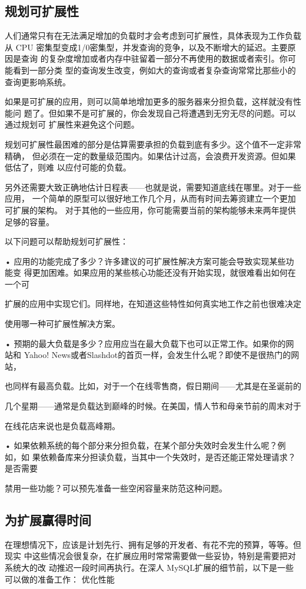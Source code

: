 \subsection{规划可扩展性}
人们通常只有在无法满足增加的负载时才会考虑到可扩展性，具体表现为工作负载从
CPU 密集型变成1/0密集型，并发查询的竞争，以及不断增大的延迟。主要原因是查询
的复杂度增加或者内存中驻留着一部分不再使用的数据或者索引。你可能看到一部分类
型的查询发生改变，例如大的查询或者复杂查询常常比那些小的查询更影响系统。

如果是可扩展的应用，则可以简单地增加更多的服务器来分担负载，这样就没有性能问
题了。但如果不是可扩展的，你会发现自己将遭遇到无穷无尽的问题。可以通过规划可
扩展性来避免这个问题。

规划可扩展性最困难的部分是估算需要承担的负载到底有多少。这个值不一定非常精确，
但必须在一定的数量级范围内。如果估计过高，会浪费开发资源。但如果低估了，则难
以应付可能的负载。

另外还需要大致正确地估计日程表——也就是说，需要知道底线在哪里。对于一些应用，
一个简单的原型可以很好地工作几个月，从而有时间去筹资建立一个更加可扩展的架构。
对于其他的一些应用，你可能需要当前的架构能够未来两年提供足够的容量。

以下问题可以帮助规划可扩展性：

• 应用的功能完成了多少？许多建议的可扩展性解决方案可能会导致实现某些功能变
得更加困难。如果应用的某些核心功能还没有开始实现，就很难看出如何在一个可

扩展的应用中实现它们。同样地，在知道这些特性如何真实地工作之前也很难决定

使用哪一种可扩展性解决方案。

• 预期的最大负载是多少？应用应当在最大负载下也可以正常工作。如果你的网站和
Yahoo! News或者Slashdot的首页一样，会发生什么呢？即使不是很热门的网站，

也同样有最高负载。比如，对于一个在线零售商，假日期间——尤其是在圣诞前的

几个星期——通常是负载达到巅峰的时候。在美国，情人节和母亲节前的周末对于

在线花店来说也是负载高峰期。

• 如果依赖系统的每个部分来分担负载，在某个部分失效时会发生什么呢？例如，如
果依赖备库来分担读负载，当其中一个失效时，是否还能正常处理请求？是否需要

禁用一些功能？可以预先准备一些空闲容量来防范这种问题。

\subsection{为扩展赢得时间}
在理想情况下，应该是计划先行、拥有足够的开发者、有花不完的预算，等等。但现实
中这些情况会很复杂，在扩展应用时常常需要做一些妥协，特别是需要把对系统大的改
动推迟一段时间再执行。在深人 MySQL扩展的细节前，以下是一些可以做的准备工作：
优化性能

